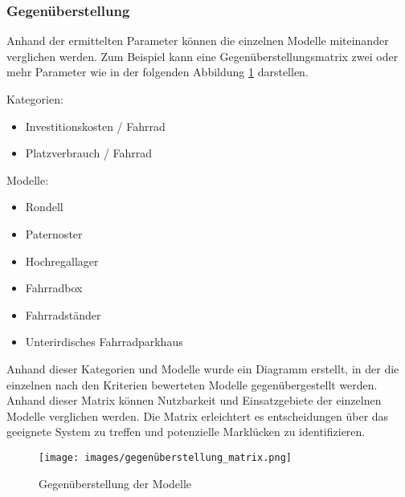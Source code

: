 \subsubsection{Gegenüberstellung}

Anhand der ermittelten Parameter können die einzelnen Modelle miteinander verglichen werden. Zum Beispiel kann eine Gegenüberstellungsmatrix zwei oder mehr Parameter wie in der folgenden Abbildung \ref{fig:gegenueberstellung} darstellen.

Kategorien:
\begin{itemize}
  \item Investitionskosten / Fahrrad
  \item Platzverbrauch / Fahrrad
\end{itemize}

Modelle:
\begin{itemize}
  \item Rondell
  \item Paternoster
  \item Hochregallager
  \item Fahrradbox
  \item Fahrradständer
  \item Unterirdisches Fahrradparkhaus
\end{itemize}

Anhand dieser Kategorien und Modelle wurde ein Diagramm erstellt, in der die einzelnen nach den Kriterien bewerteten Modelle gegenübergestellt werden. Anhand dieser Matrix können Nutzbarkeit und Einsatzgebiete der einzelnen Modelle verglichen werden. Die Matrix erleichtert es entscheidungen über das geeignete System zu treffen und potenzielle Marklücken zu identifizieren.

\begin{figure}[h]
  \centering
  \texttt{[image: images/gegenüberstellung\_matrix.png]}
  \caption{Gegenüberstellung der Modelle}
  \label{fig:gegenueberstellung}
\end{figure}